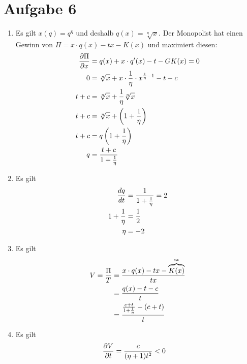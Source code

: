 \documentclass{article}
\begin{document}
	\section*{Aufgabe 6}
	\begin{enumerate}[label=(\alph*)]
		\item Es gilt $x(q)=q^\eta$ und deshalb $q(x)=\sqrt[\eta]{x}$. Der Monopolist hat einen Gewinn von $\Pi=x\cdot q(x) - tx - K(x)$ und maximiert diesen:
		\begin{align}
			\frac{\partial\Pi}{\partial x} &= q(x) + x\cdot q'(x) - t - GK(x) = 0 \notag \\
			0 &= \sqrt[\eta]{x} + x\cdot\frac{1}{\eta}\cdot x^{\frac{1}{\eta}-1} - t - c \notag \\
			t+c &= \sqrt[\eta]{x} + \frac{1}{\eta}\sqrt[\eta]{x} \notag \\
			t+c &= \sqrt[\eta]{x} + \left(1+\frac{1}{\eta}\right) \notag \\
			t+c &= q\left(1+\frac{1}{\eta}\right) \notag \\
			q &= \frac{t+c}{1+\frac{1}{\eta}} \notag
		\end{align}
		\item Es gilt
		\begin{align}
			\frac{dq}{dt} &= \frac{1}{1+\frac{1}{\eta}} = 2 \notag \\
			1+\frac{1}{\eta} &= \frac{1}{2} \notag \\
			\eta &= -2 \notag
		\end{align}
		\item Es gilt
		\begin{align}
			V = \frac{\Pi}{T} &= \frac{x\cdot q(x) - tx - \overbrace{K(x)}^{cx}}{tx} \notag \\
			&= \frac{q(x)-t-c}{t} \notag \\
			&= \frac{\frac{c+t}{1+\frac{1}{\eta}} - (c+t)}{t} \notag
		\end{align}
		\item Es gilt
		\begin{align}
			\frac{\partial V}{\partial t} &= \frac{c}{(\eta+1)t^2} < 0 \notag
		\end{align}
	\end{enumerate}
	
\end{document}
